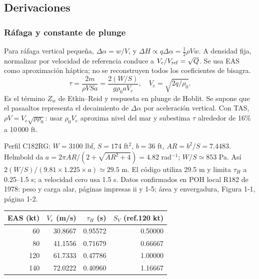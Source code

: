 \documentclass[11pt,a4paper]{article}
\begin{document}
\subsection{Derivaciones}


\subsubsection{Ráfaga y constante de plunge}
Para ráfaga vertical pequeña, $\Delta\alpha=w/V$, y $\Delta H\propto q\Delta\alpha=\tfrac12\rho Vw$. A densidad fija, normalizar por velocidad de referencia conduce a $V_e/V_{\rm ref}=\sqrt Q$. Se usa EAS como aproximación háptica; no se reconstruyen todos los coeficientes de bisagra.
\begin{equation}
\tau=\frac{2m}{\rho VSa}=\frac{2(W/S)}{g\rho_0aV_e},\quad V_e=\sqrt{2q/\rho_0}.
\end{equation}
Es el término $Z_w$ de Etkin--Reid y respuesta en plunge de Hoblit. Se supone que el pasaaltos representa el decaimiento de $\Delta\alpha$ por aceleración vertical. Con TAS, $\rho V=V_e\sqrt{\rho\rho_0}$: usar $\rho_0V_e$ aproxima nivel del mar y subestima $\tau$ alrededor de 16\% a 10\,000 ft.

Perfil C182RG: $W=3100$ lbf, $S=174$ ft$^2$, $b=36$ ft, $AR=b^2/S=7.4483$. Helmbold da $a=2\pi AR/(2+\sqrt{AR^2+4})=4.82$ rad$^{-1}$; $W/S\simeq853$ Pa. Así $2(W/S)/(9.81\times1.225\times a)\simeq29.5$ m. El código utiliza 29.5 m y limita $\tau_H$ a 0.25--1.5 s; a velocidad cero usa 1.5 s. Datos confirmados en POH local R182 de 1978: peso y carga alar, páginas impresas ii y 1-5; área y envergadura, Figura 1-1, página 1-2.
\begin{center}\begin{tabular}{rrrr}\toprule EAS (kt)&$V_e$ (m/s)&$\tau_H$ (s)&$S_V$ (ref.120 kt)\\\midrule
60&30.8667&0.95572&0.50000\\80&41.1556&0.71679&0.66667\\120&61.7333&0.47786&1.00000\\140&72.0222&0.40960&1.16667\\\bottomrule\end{tabular}\end{center}
\end{document}

